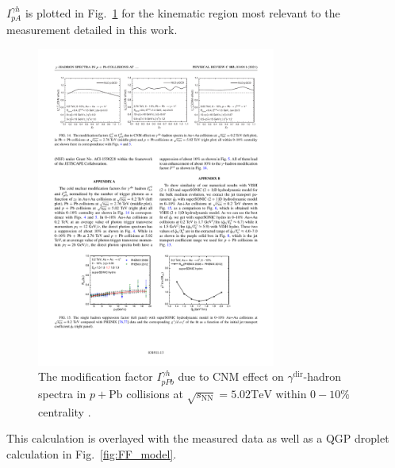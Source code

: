 
  $I_{pA}^{\gamma h}$ is plotted in Fig.~\ref{fig:cnm_Iaa} for the kinematic region most relevant to the measurement detailed in this work.

 \begin{figure}[htpb]
   \centering
   \includegraphics[width=0.7\textwidth]{cnm_Iaa}
   \caption{The modification factor $I_{p P b}^{\gamma h}$ due to CNM effect on $\gamma^{\text {dir}}$-hadron spectra in $p+\mathrm{Pb}$ collisions at $\sqrt{s_{\mathrm{NN}}}=5.02 \mathrm{TeV}$ within $0-10 \%$ centrality \cite{Xie2021}.}
   \label{fig:cnm_Iaa}
 \end{figure} 

 This calculation is overlayed with the measured data as well as a QGP droplet calculation in Fig.~\ref{fig:FF_model}.

